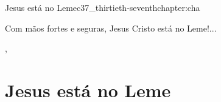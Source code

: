 \begin{chapterpage}{Jesus está no Leme}{c37_thirtieth-seventhchapter:cha}

\begin{myquotation} Com mãos fortes e seguras,
Jesus Cristo está no Leme!...
\par\vspace*{15mm}
\mbox{}\hfill {} 
, %
\par\end{myquotation}

\end{chapterpage}



\section{Jesus está no Leme}\label{c1_basicformatting:sec}

